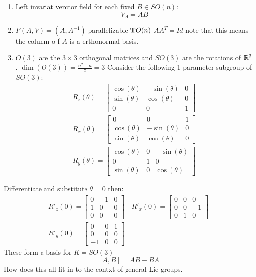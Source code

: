 \begin{enumerate}[1)]
\item Left invariat verctor field for each fixed $B\in SO(n)$:
$$V_A = AB$$
\item $F(A,V) = (A,A^{-1})$ parallelizable $\text{\textbf{T}} O(n)$ $AA^T=Id$ note that this means the column o f $A$ is a orthonormal basis.
\item $O(3)$ are the $3\times3$ orthogonal matrices and $SO(3)$ are the rotations of $\mathbb{R}^3$. $\dim(O(3)) = \frac{n^2-n}{2} = 3$ Consider the following 1 parameter subgroup of $SO(3)$:
\begin{gather*}
R_z(\theta) = \begin{bmatrix} 
\cos(\theta) & -\sin(\theta) & 0 \\
\sin(\theta) & \cos(\theta) & 0 \\
0 & 0 & 1
\end{bmatrix}\\
R_x(\theta) = \begin{bmatrix} 
0 & 0 & 1\\
\cos(\theta) & -\sin(\theta) & 0 \\
\sin(\theta) & \cos(\theta) & 0 
\end{bmatrix}\\
R_y(\theta) = \begin{bmatrix} 
\cos(\theta) & 0 &  -\sin(\theta) \\
0 & 1 & 0 \\
\sin(\theta) & 0 & \cos(\theta)   
\end{bmatrix}
\end{gather*}
\end{enumerate}

Differentiate and substitute $\theta=0$ then:
\begin{gather*}
R'_z(0) = \begin{bmatrix} 
0 & -1 & 0 \\
1 & 0 & 0 \\
0 & 0 & 0 
\end{bmatrix}\quad
R'_x(0) = \begin{bmatrix}
0 & 0 & 0 \\
0 & 0 & -1 \\
0 & 1 & 0
\end{bmatrix}\\
R'_y(0) = \begin{bmatrix}
0 & 0 & 1 \\
0 & 0 & 0 \\
-1 & 0 & 0
\end{bmatrix}
\end{gather*}
These form a basis for $K = SO(3)$ 
$$ [A,B] = AB - BA $$
How does this all fit in to the contxt of general Lie groups.\\
